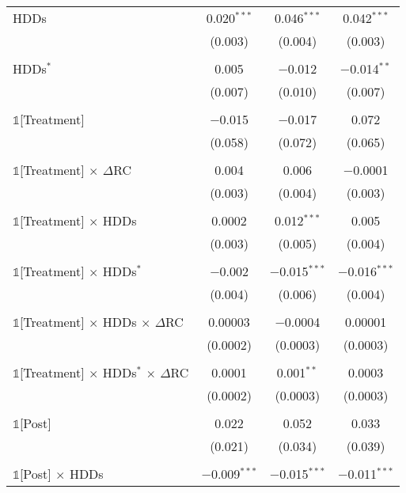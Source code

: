 {\begin{table}[t!]
\begin{ThreePartTable}
\begin{longtable}{@{\extracolsep{40pt}}lccc}
                HDDs & 0.020$^{***}$ & 0.046$^{***}$ & 0.042$^{***}$ \\
                & (0.003) & (0.004) & (0.003) \\
                & & & \\
                HDDs$^{*}$ & 0.005 & $-$0.012 & $-$0.014$^{**}$ \\
                & (0.007) & (0.010) & (0.007) \\
                & & & \\
                $\mathbb{1}$[Treatment] & $-$0.015 & $-$0.017 & 0.072 \\
                & (0.058) & (0.072) & (0.065) \\
                & & & \\
                $\mathbb{1}$[Treatment] $\times$ $\Delta$RC & 0.004 & 0.006 & $-$0.0001 \\
                & (0.003) & (0.004) & (0.003) \\
                & & & \\
                $\mathbb{1}$[Treatment] $\times$ HDDs & 0.0002 & 0.012$^{***}$ & 0.005 \\
                & (0.003) & (0.005) & (0.004) \\
                & & & \\
                $\mathbb{1}$[Treatment] $\times$ HDDs$^{*}$ & $-$0.002 & $-$0.015$^{***}$ & $-$0.016$^{***}$ \\
                & (0.004) & (0.006) & (0.004) \\
                & & & \\
                $\mathbb{1}$[Treatment] $\times$ HDDs $\times$ $\Delta$RC & 0.00003 & $-$0.0004 & 0.00001 \\
                & (0.0002) & (0.0003) & (0.0003) \\
                & & & \\
                $\mathbb{1}$[Treatment] $\times$ HDDs$^{*}$ $\times$ $\Delta$RC & 0.0001 & 0.001$^{**}$ & 0.0003 \\
                & (0.0002) & (0.0003) & (0.0003) \\
                & & & \\
                $\mathbb{1}$[Post] & 0.022 & 0.052 & 0.033 \\
                & (0.021) & (0.034) & (0.039) \\
                & & & \\
                $\mathbb{1}$[Post] $\times$ HDDs & $-$0.009$^{***}$ & $-$0.015$^{***}$ & $-$0.011$^{***}$ \\

\end{longtable}
\end{ThreePartTable}
\end{table}}
